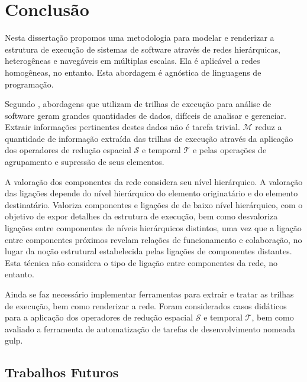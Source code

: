 
%

\chapter{Conclusão}
\label{Chapter:Conclusion}

Nesta dissertação propomos uma metodologia para modelar e renderizar a estrutura
de execução de sistemas de software através de redes hierárquicas, heterogêneas
e navegáveis em múltiplas escalas.
Ela é aplicável a redes homogêneas, no entanto.
Esta abordagem é agnóstica de linguagens de programação.


Segundo , abordagens que utilizam de trilhas de
execução para análise de software geram grandes quantidades de dados, difíceis
de analisar e gerenciar. Extrair informações pertinentes destes dados não é
tarefa trivial.
$\mathcal{M}$ reduz a quantidade de informação extraída das trilhas de execução
através da aplicação dos operadores de redução espacial $\mathcal{S}$ e temporal
$\mathcal{T}$ e pelas operações de agrupamento e supressão de seus elementos.

A valoração dos componentes da rede considera seu nível hierárquico. A valoração
das ligações depende do nível hierárquico do elemento originatário e do elemento
destinatário. Valoriza componentes e ligações de de baixo nível hierárquico, com
o objetivo de expor detalhes da estrutura de execução, bem como desvaloriza
ligações entre componentes de níveis hierárquicos distintos, uma vez que a
ligação entre componentes próximos revelam relações de funcionamento e 
colaboração, no lugar da noção estrutural estabelecida pelas ligações de
componentes distantes. Esta técnica não considera o tipo de ligação entre
componentes da rede, no entanto.

Ainda se faz necessário implementar ferramentas para extrair e tratar as trilhas
de execução, bem como renderizar a rede. Foram considerados casos didáticos para
a aplicação dos operadores de redução espacial $\mathcal{S}$ e temporal
$\mathcal{T}$, bem como avaliado a ferramenta de automatização de tarefas de
desenvolvimento nomeada gulp.

\section{Trabalhos Futuros}
\label{sec:FutureWork}

